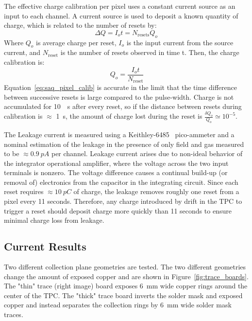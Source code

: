 The effective charge calibration per pixel uses a constant current source as an input to each channel.
A current source is used to deposit a known quantity of charge, which is related to the number of resets by:
\begin{equation}
 \Delta Q = I_{o}t = N_{\mathrm{resets}}Q_{o}
\end{equation}
Where $Q_{o}$ is average charge per reset, $I_{o}$ is the input current from the source current, and $N_{\mathrm{reset}}$ is the number of resets observed in time t.
Then, the charge calibration is:
\begin{equation}~\label{eq:saq_pixel_calib}
 Q_{o} = \frac{I_{o}t}{N_{\mathrm{reset}}}
\end{equation}
Equation~\ref{eq:saq_pixel_calib} is accurate in the limit that the time difference between successive resets is large compared to the pulse-width.
Charge is not accumulated for 10~\unit{\mu s} after every reset, so if the distance between resets during calibration is $\approx$ 1~\unit{s}, the amount of charge lost during the reset is $\frac{\delta Q_{o}}{Q_{o}} \simeq 10^{-5}$.

The Leakage current is measured using a Keithley-6485~\citep{picoammeter-6485-datasheet} pico-ammeter and a nominal estimation of the leakage in the presence of only field and gas measured to be $\approx 0.9~\unit{pA}$ per channel.
Leakage current arises due to non-ideal behavior of the integrator operational amplifier, where the voltage across the two input terminals is nonzero.
The voltage difference causes a continual build-up (or removal of) electronics from the capacitor in the integrating circuit.
Since each reset requires $\approx 10~\unit{pC}$ of charge, the leakage removes roughly one reset from a pixel every 11 seconds.
Therefore, any charge introduced by drift in the TPC to trigger a reset should deposit charge more quickly than 11 seconds to ensure minimal charge loss from leakage.

\subsection{Current Results}
Two different collection plane geometries are tested.
The two different geometries change the amount of exposed copper and are shown in Figure~\ref{fig:trace_boards}.
The "thin" trace (right image) board exposes 6~\unit{mm} wide copper rings around the center of the TPC.
The "thick" trace board inverts the solder mask and exposed copper and instead separates the collection rings by 6~\unit{mm} wide solder mask traces.

